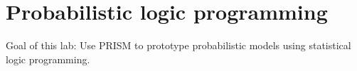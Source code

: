 \chapter{Probabilistic logic programming}

Goal of this lab:
Use PRISM to prototype probabilistic models using statistical logic programming.

